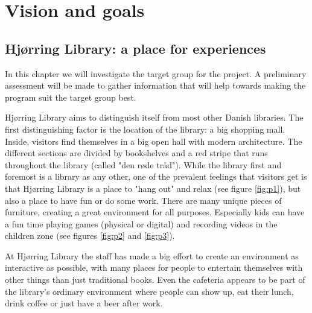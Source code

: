 \chapter{Vision and goals}
\section{Hj{\o}rring Library: a place for experiences}\label{hjoerring}
In this chapter we will investigate the target group for the project. A preliminary assessment will be made to gather information that will help towards making the program suit the target group best.

Hj{\o}rring Library aims to distinguish itself from most other Danish libraries. The first distinguishing factor is the location of the library: a big shopping mall. Inside, visitors find themselves in a big open hall with modern architecture. The different sections are divided by bookshelves and a red stripe that runs throughout the library (called "den r{\o}de tr{\aa}d"). While the library first and foremost is a library as any other, one of the prevalent feelings that visitors get is that Hj{\o}rring Library is a place to "hang out" and relax (see figure \ref{fig:p1}), but also a place to have fun or do some work. There are many unique pieces of furniture, creating a great environment for all purposes. Especially kids can have a fun time playing games (physical or digital) and recording videos in the children zone (see figures \ref{fig:p2} and \ref{fig:p3}).

At Hj{\o}rring Library the staff has made a big effort to create an environment as interactive as possible, with many places for people to entertain themselves with other things than just traditional books. Even the cafeteria appears to be part of the library's ordinary environment where people can show up, eat their lunch, drink coffee or just have a beer after work.

